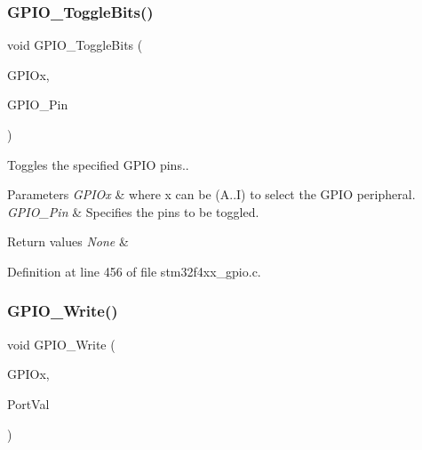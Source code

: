 \mbox{\label{group___g_p_i_o_gac1b837c66258872740d5f89f23549ab1}} 
\subsubsection{\texorpdfstring{G\+P\+I\+O\+\_\+\+Toggle\+Bits()}{GPIO\_ToggleBits()}}
{\footnotesize\ttfamily void G\+P\+I\+O\+\_\+\+Toggle\+Bits (\begin{DoxyParamCaption}\item[{\hyperlink{struct_g_p_i_o___type_def}{G\+P\+I\+O\+\_\+\+Type\+Def} $\ast$}]{G\+P\+I\+Ox,  }\item[{uint16\+\_\+t}]{G\+P\+I\+O\+\_\+\+Pin }\end{DoxyParamCaption})}



Toggles the specified G\+P\+IO pins.. 


\begin{DoxyParams}{Parameters}
{\em G\+P\+I\+Ox} & where x can be (A..I) to select the G\+P\+IO peripheral. \\
\hline
{\em G\+P\+I\+O\+\_\+\+Pin} & Specifies the pins to be toggled. \\
\hline
\end{DoxyParams}

\begin{DoxyRetVals}{Return values}
{\em None} & \\
\hline
\end{DoxyRetVals}


Definition at line 456 of file stm32f4xx\+\_\+gpio.\+c.

\mbox{\label{group___g_p_i_o_gaa925f19c8547a00c7a0c269a84873bf9}} 
\subsubsection{\texorpdfstring{G\+P\+I\+O\+\_\+\+Write()}{GPIO\_Write()}}
{\footnotesize\ttfamily void G\+P\+I\+O\+\_\+\+Write (\begin{DoxyParamCaption}\item[{\hyperlink{struct_g_p_i_o___type_def}{G\+P\+I\+O\+\_\+\+Type\+Def} $\ast$}]{G\+P\+I\+Ox,  }\item[{uint16\+\_\+t}]{Port\+Val }\end{DoxyParamCaption})}



